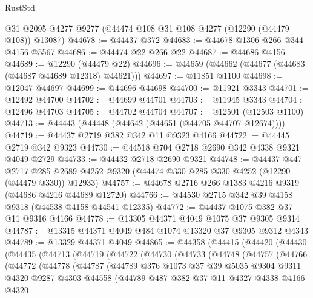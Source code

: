 \begin{lexlean}{RustStd}
\begin{coremodule}
    @31
    @2095
    @4277
    @9277
    (@44474 @108 @31 @108 @4277 (@12290 (@44479 @108)) @13087)
@44678 := @44437 @372
@44683 := @44678 @1306 @266 @344 @4156 @5567
@44686 := @44474 @22 @266 @22
@44687 := @44686 @4156
@44689 := @12290 (@44479 @22)
@44696 := @44659 (@44662 (@44677 (@44683 (@44687 @44689 @12318) @44621)))
@44697 := @11851 @1100
@44698 := @12047 @44697
@44699 := @44696 @44698
@44700 := @11921 @3343
@44701 := @12492 @44700
@44702 := @44699 @44701
@44703 := @11945 @3343
@44704 := @12496 @44703
@44705 := @44702 @44704
@44707 := @12501 (@12503 @1100)
@44713 := @44443 (@44448 (@44642 (@44651 (@44705 @44707 @12674))))
@44719 := @44437 @2719 @382 @342 @11 @9323 @4166
@44722 := @44445 @2719 @342 @9323
@44730 := @44518 @704 @2718 @2690 @342 @4338 @9321 @4049 @2729
@44733 := @44432 @2718 @2690 @9321
@44748 := @44437
    @447
    @2717
    @285
    @2689
    @4252
    @9320
    (@44474 @330 @285 @330 @4252 (@12290 (@44479 @330)) @12933)
@44757 := @44678 @2716 @266 @1383 @4216 @9319 (@44686 @4216 @44689 @12720)
@44766 := @44530 @2715 @342 @39 @4158 @9318 (@44538 @4158 @44541 @12335)
@44772 := @44437 @1075 @382 @37 @11 @9316 @4166
@44778 := @13305 @44371 @4049 @1075 @37 @9305 @9314
@44787 := @13315 @44371 @4049 @484 @1074 @13320 @37 @9305 @9312 @4343
@44789 := @13329 @44371 @4049
@44865 := @44358
    (@44415
      (@44420
        (@44430
          (@44435
            (@44713
              (@44719
                (@44722
                  (@44730
                    (@44733
                      (@44748
                        (@44757
                          (@44766
                            (@44772
                              (@44778
                                (@44787
                                  (@44789
                                    @376
                                    @1073
                                    @37
                                    @39
                                    @5035
                                    @9304
                                    @9311
                                    @4320
                                    @9287
                                    @4303
                                    @44558
                                    (@44789
                                      @487
                                      @382
                                      @37
                                      @11
                                      @4327
                                      @4338
                                      @4166
                                      @4320

\end{coremodule}
\end{lexlean}
